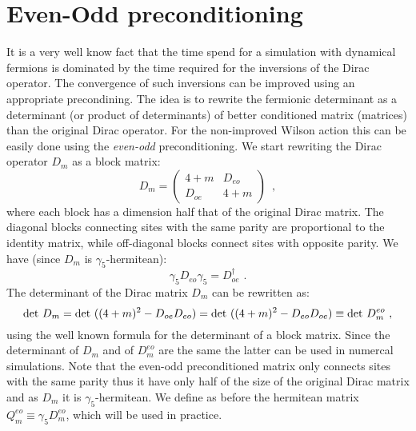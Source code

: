 \documentclass{article}[12pt]
\begin{document}
\section{Even-Odd preconditioning}
It is a very well know fact that the time spend for a simulation with dynamical fermions
is dominated by the time required for the inversions of the Dirac operator.
The convergence of such inversions can be improved using an appropriate precondining.
The idea is to rewrite the fermionic determinant as a determinant
(or product of determinants) of better conditioned matrix (matrices) than the original
Dirac operator.
For the non-improved Wilson action this can be easily done using the \textit{even-odd}
preconditioning. We start rewriting the Dirac operator $D_m$ as a block matrix:
\begin{equation}
D_m = \begin{pmatrix}
4+m& D_{eo}\\
D_{oe} &4+m
\end{pmatrix}\,\,\, ,
\end{equation}
where each block has a dimension half that of the original Dirac matrix. The diagonal
blocks connecting sites with the same parity are proportional to the identity matrix,
while off-diagonal blocks connect sites with opposite parity. We have (since $D_m$
is $\gamma_5$-hermitean):
\begin{equation}
\gamma_5 D_{eo} \gamma_5 = D_{oe}^\dagger\,\, .
\end{equation}
The determinant of the Dirac matrix $D_m$ can be rewritten as:
\begin{equation}
{\rm det\ } D_m = {\rm det\ } ( (4+m)^2 - D_{oe} D_{eo} ) = {\rm det\ } ( (4+m)^2 - D_{eo} D_{oe} ) \equiv {\rm det\ } D^{eo}_m\,\, ,
\end{equation}
using the well known formula for the determinant of a block matrix.
Since the determinant of $D_m$ and of $D_m^{eo}$ are the same the latter can be used
in numercal simulations. Note that the even-odd preconditioned matrix only connects sites
with the same parity thus it have only half of the size of the original Dirac matrix and
as $D_m$ it is $\gamma_5$-hermitean. We define as before the hermitean matrix
$Q_m^{eo}\equiv \gamma_5 D_m^{eo}$, which will be used in practice.
\end{document}
